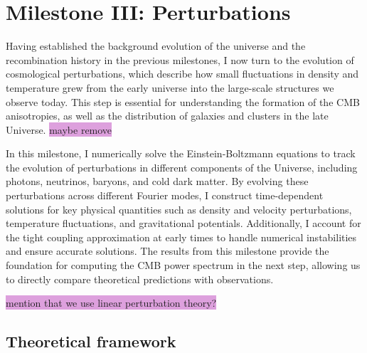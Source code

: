 \documentclass{aa}
\numberwithin{equation}{section}
\numberwithin{table}{section}
\numberwithin{figure}{section}
\begin{document}
\section{Milestone III: Perturbations}\label{sec: milestone III}
Having established the background evolution of the universe and the recombination history in the previous milestones, I now turn to the evolution of cosmological perturbations, which describe how small fluctuations in density and temperature grew from the early universe into the large-scale structures we observe today. This step is essential for understanding the formation of the CMB anisotropies, as well as the distribution of galaxies and clusters in the late Universe. \colorbox{Plum}{maybe remove}

In this milestone, I numerically solve the Einstein-Boltzmann equations to track the evolution of perturbations in different components of the Universe, including photons, neutrinos, baryons, and cold dark matter. By evolving these perturbations across different Fourier modes, I construct time-dependent solutions for key physical quantities such as density and velocity perturbations, temperature fluctuations, and gravitational potentials. Additionally, I account for the tight coupling approximation at early times to handle numerical instabilities and ensure accurate solutions. The results from this milestone provide the foundation for computing the CMB power spectrum in the next step, allowing us to directly compare theoretical predictions with observations.

\colorbox{Plum}{mention that we use linear perturbation theory?}


\subsection{Theoretical framework}\label{subsec: III theory}
\end{document}
